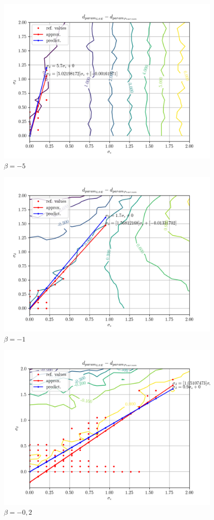 \documentclass[a4paper,landscape,hidelinks,14pt]{extarticle}
\begin{document}
\begin{figure}[h!]
  \centering
  \includegraphics[width=.8\linewidth]{fig/beta--5_param-accs-diff-approx.png}
  \caption{$ \beta = -5 $}\label{fig:beta--5}
\end{figure}

\begin{figure}[h!]
  \centering
  \includegraphics[width=.8\linewidth]{fig/beta--1_param-accs-diff-approx.png}
  \caption{$ \beta = -1 $}\label{fig:beta--1}
\end{figure}

\begin{figure}[h!]
  \centering
  \includegraphics[width=.8\linewidth]{fig/beta--0,2_param-accs-diff-approx.png}
  \caption{$ \beta = -0{,}2 $}\label{fig:beta--0,2}
\end{figure}
\end{document}
